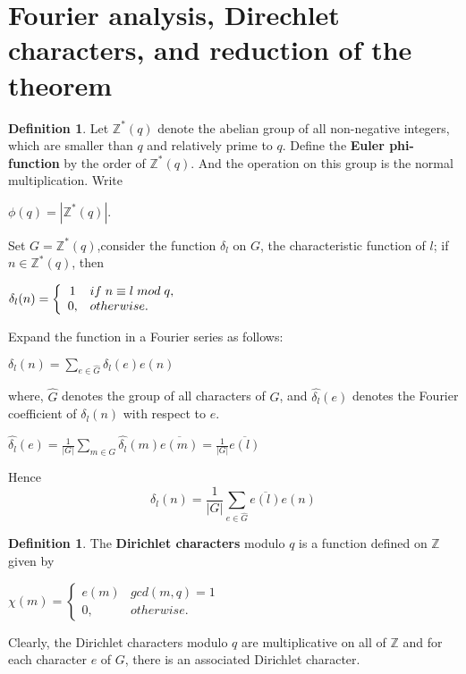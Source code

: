 \documentclass[psamsfonts]{amsart}
\theoremstyle{definition}
\newtheorem{defn}[thm]{Definition}
\theoremstyle{remark}
\numberwithin{equation}{section}
\begin{document}
	\section{Fourier analysis, Direchlet characters, and reduction of the theorem}
		\begin{defn}
			Let $\mathbb{Z}^*(q)$ denote the abelian group of all non-negative integers, which are smaller than $q$ and relatively prime to $q$. Define the \textbf{Euler phi-function} by the order of $\mathbb{Z}^*(q)$. And the operation on this group is the normal multiplication. Write 
			\begin{center}
				$\phi(q) = |\mathbb{Z}^*(q)|$.
			\end{center}
		\end{defn}
	 Set $G = \mathbb{Z}^*(q)$,consider the function $\delta_l$ on $G$, the characteristic function of $l$; if $n \in \mathbb{Z}^*(q)$, then\\
		\begin{center}
			$\delta_l(n)=\left\{\begin{array}{cl}
								1 & if \hspace{1mm} n \equiv l \hspace{1mm} mod \hspace {1mm} q,\\
								0, & otherwise.
									\end{array}\right.$
		\end{center}
		\vspace{2mm}
		Expand the function in a Fourier series as follows:
			\begin{center}
				$\delta_l(n) = \sum_{e \in \hat{G}} \delta_l(e)e(n) $
			\end{center}
			\vspace{1mm}
			where, $\hat{G}$ denotes the group of all characters of $G$, and $\hat{\delta_l}(e)$ denotes the Fourier coefficient of $\delta_l(n)$ with respect to $e$.
			\begin{center}
				$\hat{\delta_l}(e) = \frac{1}{|G|} \sum_{m \in G}\hat{\delta_l}(m) \overline{e(m)} = \frac{1}{|G|} \overline{e(l)}$
			\end{center}
			\vspace{1mm}
			Hence
			\begin{equation}
				\delta_l(n) = \frac{1}{|G|} \sum_{e \in \hat{G}} \overline{e(l)}e(n)
			\end{equation}
			
			\begin{defn}
				The \textbf{Dirichlet characters} modulo $q$ is a function defined on $\mathbb{Z}$ given by
				\begin{center}
					$\chi(m)=\left\{\begin{array}{cl}
								e(m) & gcd(m,q) = 1\\
								0, & otherwise.
									\end{array}\right.$
				\end{center}
			\end{defn}
			Clearly, the Dirichlet characters modulo $q$ are multiplicative on all of $\mathbb{Z}$ and for each character $e$ of $G$, there is an associated Dirichlet character.
			
\end{document}

